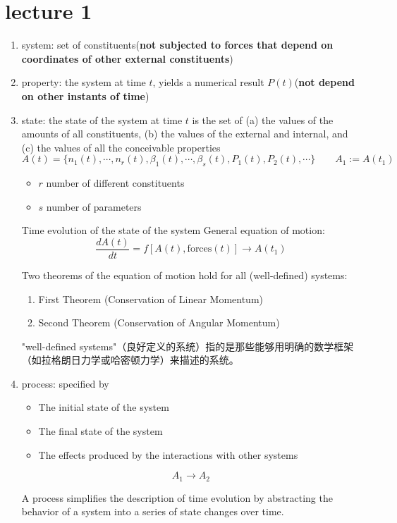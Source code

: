 \section{lecture 1}
\begin{defn}
\par\indent
\begin{enumerate}
    \item \textcolor{b1}{system}:\;
    set of constituents\;(\textbf{not subjected to forces that depend on coordinates of other external constituents})
    \item \textcolor{b1}{property}:\; 
    the system at time \( t \), yields a numerical result \( P(t) \)\;(\textbf{not depend on other instants of time})
    \item \textcolor{b1}{state}:\; 
    the state of the system at time \( t \) is the set of
     (a) the values of the amounts of all constituents,
     (b) the values of the external and internal, and
     (c) the values of all the conceivable properties
\[ A(t) = \{ n_1(t), \cdots, n_r(t), \beta_1(t), \cdots, \beta_s(t), P_1(t), P_2(t), \cdots \} 
\qquad A_1:=A(t_1)\]
\begin{itemize}
    \item \( r\) number of different constituents
    \item \( s\) number of parameters
\end{itemize}
\begin{add}
    Time evolution of the state of the system
    General equation of motion:
\[ \frac{dA(t)}{dt} = f[A(t), \text{forces}(t)] \rightarrow A(t_1)\]

Two theorems of the equation of motion hold for all (well-defined) systems:
\begin{enumerate}
\item First Theorem (Conservation of Linear Momentum)
\item Second Theorem (Conservation of Angular Momentum)
\end{enumerate}
\begin{zhu}
    "well-defined systems"（良好定义的系统）指的是那些能够用明确的数学框架（如拉格朗日力学或哈密顿力学）来描述的系统。
\end{zhu}
\end{add}
    \item \textcolor{b1}{process}:\; 
    specified by
    \begin{itemize}
    \item The initial state of the system
    \item The final state of the system
    \item The effects produced by the interactions with other systems
    \end{itemize}
    \[ A_1 \rightarrow A_2 \]
    \begin{zhu}
        A process simplifies the description of time evolution by abstracting the behavior of a system 
        into a series of state changes over time. 
        

\end{zhu}
\end{enumerate}
\end{defn}
